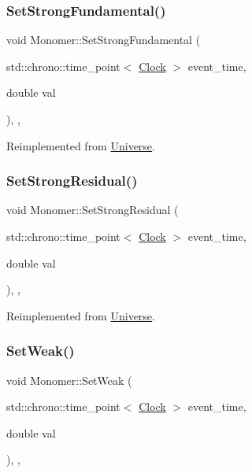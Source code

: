 \subsubsection{\texorpdfstring{Set\+Strong\+Fundamental()}{SetStrongFundamental()}}
{\footnotesize\ttfamily void Monomer\+::\+Set\+Strong\+Fundamental (\begin{DoxyParamCaption}\item[{std\+::chrono\+::time\+\_\+point$<$ \mbox{\hyperlink{universe_8h_a0ef8d951d1ca5ab3cfaf7ab4c7a6fd80}{Clock}} $>$}]{event\+\_\+time,  }\item[{double}]{val }\end{DoxyParamCaption})\hspace{0.3cm}{\ttfamily [inline]}, {\ttfamily [final]}, {\ttfamily [virtual]}}



Reimplemented from \mbox{\hyperlink{classUniverse_aafec97a231126b71c73ac1258609a284}{Universe}}.

\mbox{\label{classMonomer_ae6ca57913da27fa749d33d1c4fed27ca}} 
\subsubsection{\texorpdfstring{Set\+Strong\+Residual()}{SetStrongResidual()}}
{\footnotesize\ttfamily void Monomer\+::\+Set\+Strong\+Residual (\begin{DoxyParamCaption}\item[{std\+::chrono\+::time\+\_\+point$<$ \mbox{\hyperlink{universe_8h_a0ef8d951d1ca5ab3cfaf7ab4c7a6fd80}{Clock}} $>$}]{event\+\_\+time,  }\item[{double}]{val }\end{DoxyParamCaption})\hspace{0.3cm}{\ttfamily [inline]}, {\ttfamily [final]}, {\ttfamily [virtual]}}



Reimplemented from \mbox{\hyperlink{classUniverse_a1b2d6197ddf3d613cc30bd04d22ed8b7}{Universe}}.

\mbox{\label{classMonomer_ad4fe1db33f493575281e1a2fb35004ca}} 
\subsubsection{\texorpdfstring{Set\+Weak()}{SetWeak()}}
{\footnotesize\ttfamily void Monomer\+::\+Set\+Weak (\begin{DoxyParamCaption}\item[{std\+::chrono\+::time\+\_\+point$<$ \mbox{\hyperlink{universe_8h_a0ef8d951d1ca5ab3cfaf7ab4c7a6fd80}{Clock}} $>$}]{event\+\_\+time,  }\item[{double}]{val }\end{DoxyParamCaption})\hspace{0.3cm}{\ttfamily [inline]}, {\ttfamily [final]}, {\ttfamily [virtual]}}



